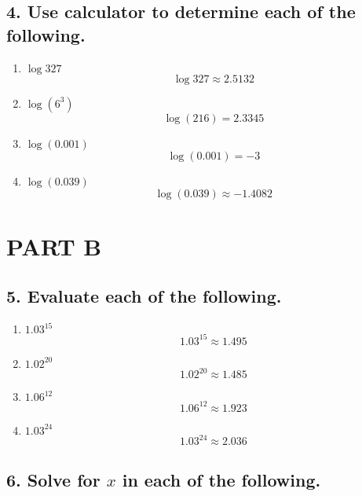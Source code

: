 \documentclass{article}
\begin{document}
\subsection*{4. Use calculator to determine each of the following.}

\begin{enumerate}
    \item $\log 327$
    \[\log 327 \approx 2.5132\]

    \item $\log (6^3)$
    \[\log (216) = 2.3345\]

    \item $\log (0.001)$
    \[\log (0.001) = -3\]

    \item $\log (0.039)$
    \[\log (0.039) \approx -1.4082\]
\end{enumerate}

\section*{PART B}

\subsection*{5. Evaluate each of the following.}

\begin{enumerate}
    \item $1.03^{15}$
    \[1.03^{15} \approx 1.495\]

    \item $1.02^{20}$
    \[1.02^{20} \approx 1.485\]

    \item $1.06^{12}$
    \[1.06^{12} \approx 1.923\]

    \item $1.03^{24}$
    \[1.03^{24} \approx 2.036\]
\end{enumerate}

\subsection*{6. Solve for $x$ in each of the following.}
\end{document}
